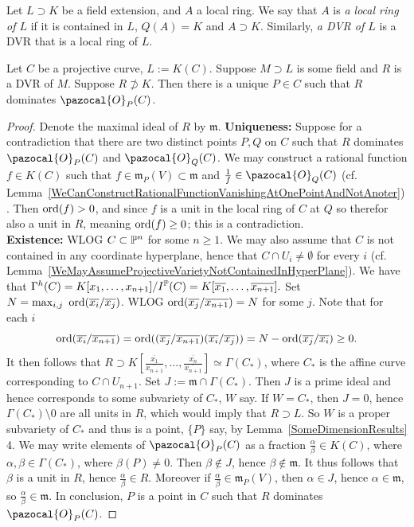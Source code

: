         \begin{definition}
            Let $L\supset K$ be a field extension, and $A$ a local ring. We say that $A$ is \textit{a local ring of $L$} if it is contained in $L$, $Q(A)=K$ and $A\supset K$. Similarly, \textit{a DVR of $L$} is a DVR that is a local ring of $L$.  
        \end{definition}
        \begin{theorem}
            Let $C$ be a projective curve, $L:=K(C)$. Suppose $M\supset L$ is some field and $R$ is a DVR of $M$. Suppose $R\not\supset K$. Then there is a unique $P\in C$ such that $R$ dominates $\pazocal{O}_P(C)$. 
        \end{theorem}
        \begin{proof}
            Denote the maximal ideal of $R$ by $\mathfrak{m}$.
            \textbf{Uniqueness:} Suppose for a contradiction that there are two distinct points $P,Q$ on $C$ such that $R$ dominates $\pazocal{O}_P(C)$ and $\pazocal{O}_Q(C)$. We may construct a rational function $f\in K(C)$ such that $f\in \mathfrak{m}_P(V)\subset \mathfrak{m}$ and $\frac{1}{f}\in\pazocal{O}_Q(C)$ (cf. Lemma~\ref{WeCanConstructRationalFunctionVanishingAtOnePointAndNotAnoter}). Then $\mathrm{ord}(f)>0$, and since $f$ is a unit in the local ring of $C$ at $Q$ so therefor also a unit in $R$, meaning $\mathrm{ord}(f)\geq 0$; this is a contradiction.\\
            \textbf{Existence:} WLOG $C\subset \mathbb{P}^n$ for some $n\geq 1$. We may also assume that $C$ is not contained in any coordinate hyperplane, hence that $C\cap U_i\neq \emptyset$ for every $i$ (cf. Lemma~\ref{WeMayAssumeProjectiveVarietyNotContainedInHyperPlane}). We have that $\Gamma^h(C)=K[x_1,\dots,x_{n+1}]/I^{\mathbb{P}}(C) = K[\overline{x_1},\dots,\overline{x_{n+1}}].$ Set $N= \max_{i,j}\ \ord(\overline{x_i}/\overline{x_j})$. WLOG $\mathrm{ord}(\overline{x_j}/\overline{x_{n+1}})=N$ for some $j$. Note that for each $i$
            $$ \mathrm{ord}(\overline{x_i}/\overline{x_{n+1}}) = \mathrm{ord}((\overline{x_j}/\overline{x_{n+1}})(\overline{x_i}/\overline{x_j}))=N-\mathrm{ord}(\overline{x_j}/\overline{x_i}) \geq 0.$$
            It then follows that $R\supset K\left[\frac{\overline{x_1}}{\overline{x_{n+1}}},\dots,\frac{\overline{x_{n}}}{\overline{x_{n+1}}}\right] \simeq \Gamma(C_\ast)$, where $C_\ast$ is the affine curve corresponding to $C\cap U_{n+1}$. Set $J:= \mathfrak{m}\cap \Gamma(C_\ast)$. Then $J$ is a prime ideal and hence corresponds to some subvariety of $C_\ast$, $W$ say. If $W=C_\ast$, then $J=0$, hence $\Gamma(C_\ast)\setminus 0$ are all units in $R$, which would imply that $R\supset L$. So $W$ is a proper subvariety of $C_\ast$ and thus is a point, $\{P\}$ say, by Lemma~\ref{SomeDimensionResults} 4. We may write elements of $\pazocal{O}_P(C)$ as a fraction $\frac{\alpha}{\beta}\in K(C)$, where $\alpha,\beta\in \Gamma(C_\ast)$, where $\beta(P)\neq 0$. Then $\beta\notin J$, hence $\beta\notin \mathfrak{m}$. It thus follows that $\beta$ is a unit in $R$, hence $\frac{\alpha}{\beta}\in R$. Moreover if $\frac{\alpha}{\beta}\in\mathfrak{m}_P(V)$, then $\alpha\in J$, hence $\alpha \in \mathfrak{m}$, so $\frac{\alpha}{\beta}\in \mathfrak{m}$. In conclusion, $P$ is a point in $C$ such that $R$ dominates $\pazocal{O}_P(C)$.   
        \end{proof}
